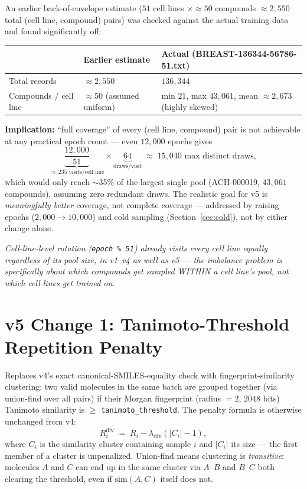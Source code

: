 \documentclass[11pt]{article}
\newcommand{\note}[1]{{\itshape\color{notegray}#1\par}}
\newcommand{\code}[1]{\texttt{#1}}
\begin{document}
An earlier back-of-envelope estimate ($51$ cell lines $\times \approx 50$ compounds $\approx 2{,}550$ total (cell line, compound) pairs) was checked against the actual training data and found significantly off:

\begin{center}
\begin{tabular}{@{}l l l@{}}
\toprule
 & \textbf{Earlier estimate} & \textbf{Actual (BREAST-136344-56786-51.txt)} \\
\midrule
Total records & $\approx 2{,}550$ & $136{,}344$ \\
Compounds / cell line & $\approx 50$ (assumed uniform) & min $21$, max $43{,}061$, mean $\approx 2{,}673$ (highly skewed) \\
\bottomrule
\end{tabular}
\end{center}

\textbf{Implication:} ``full coverage'' of every (cell line, compound) pair is not achievable at any practical epoch count --- even $12{,}000$ epochs gives
\[
  \underbrace{\frac{12{,}000}{51}}_{\approx\,235\text{ visits/cell line}} \times \underbrace{64}_{\text{draws/visit}} \;\approx\; 15{,}040 \text{ max distinct draws},
\]
which would only reach $\sim$35\% of the largest single pool (ACH-000019, $43{,}061$ compounds), assuming zero redundant draws. The realistic goal for v5 is \emph{meaningfully better} coverage, not complete coverage --- addressed by raising epochs ($2{,}000 \to 10{,}000$) and cold sampling (Section~\ref{sec:cold}), not by either change alone.

\note{Cell-line-level rotation (\code{epoch \% 51}) already visits every cell line equally regardless of its pool size, in v1--v4 as well as v5 --- the imbalance problem is specifically about which compounds get sampled WITHIN a cell line's pool, not which cell lines get trained on.}

\section{v5 Change 1: Tanimoto-Threshold Repetition Penalty}
\label{sec:tanimoto}

Replaces v4's exact canonical-SMILES-equality check with fingerprint-similarity clustering: two valid molecules in the same batch are grouped together (via union-find over all pairs) if their Morgan fingerprint (radius $=2$, $2048$ bits) Tanimoto similarity is $\geq$ \code{tanimoto\_threshold}. The penalty formula is otherwise unchanged from v4:
\[
  R_i^{\mathrm{div}} \;=\; R_i - \lambda_{\mathrm{div}} \left( |C_i| - 1 \right),
\]
where $C_i$ is the similarity cluster containing sample $i$ and $|C_i|$ its size --- the first member of a cluster is unpenalized. Union-find means clustering is \emph{transitive}: molecules $A$ and $C$ can end up in the same cluster via $A$--$B$ and $B$--$C$ both clearing the threshold, even if $\mathrm{sim}(A,C)$ itself does not.
\end{document}
